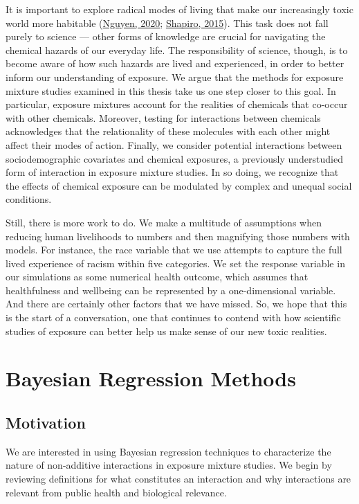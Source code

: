 \documentclass[12pt, twoside]{amherstthesis}
\begin{document}
It is important to explore radical modes of living that make our increasingly toxic world more habitable (\protect\hyperlink{ref-nguyen_breathless_2020}{Nguyen, 2020}; \protect\hyperlink{ref-shapiro_attuning_2015}{Shapiro, 2015}). This task does not fall purely to science --- other forms of knowledge are crucial for navigating the chemical hazards of our everyday life. The responsibility of science, though, is to become aware of how such hazards are lived and experienced, in order to better inform our understanding of exposure. We argue that the methods for exposure mixture studies examined in this thesis take us one step closer to this goal. In particular, exposure mixtures account for the realities of chemicals that co-occur with other chemicals. Moreover, testing for interactions between chemicals acknowledges that the relationality of these molecules with each other might affect their modes of action. Finally, we consider potential interactions between sociodemographic covariates and chemical exposures, a previously understudied form of interaction in exposure mixture studies. In so doing, we recognize that the effects of chemical exposure can be modulated by complex and unequal social conditions.

Still, there is more work to do. We make a multitude of assumptions when reducing human livelihoods to numbers and then magnifying those numbers with models. For instance, the race variable that we use attempts to capture the full lived experience of racism within five categories. We set the response variable in our simulations as some numerical health outcome, which assumes that healthfulness and wellbeing can be represented by a one-dimensional variable. And there are certainly other factors that we have missed. So, we hope that this is the start of a conversation, one that continues to contend with how scientific studies of exposure can better help us make sense of our new toxic realities.

\hypertarget{bayes}{%
\chapter{Bayesian Regression Methods}\label{bayes}}

\hypertarget{motivation}{%
\section{Motivation}\label{motivation}}

We are interested in using Bayesian regression techniques to characterize the nature of non-additive interactions in exposure mixture studies. We begin by reviewing definitions for what constitutes an interaction and why interactions are relevant from public health and biological relevance.
\end{document}
